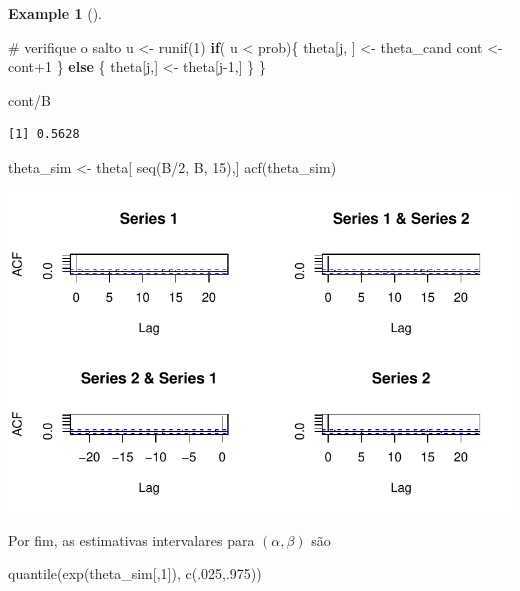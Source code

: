 \documentclass[
  letterpaper,
  DIV=11,
  numbers=noendperiod]{scrreprt}
\newenvironment{Shaded}{\begin{snugshade}}{\end{snugshade}}
\newcommand{\CommentTok}[1]{\textcolor[rgb]{0.37,0.37,0.37}{#1}}
\newcommand{\ControlFlowTok}[1]{\textcolor[rgb]{0.00,0.23,0.31}{\textbf{#1}}}
\newcommand{\DecValTok}[1]{\textcolor[rgb]{0.68,0.00,0.00}{#1}}
\newcommand{\FunctionTok}[1]{\textcolor[rgb]{0.28,0.35,0.67}{#1}}
\newcommand{\NormalTok}[1]{\textcolor[rgb]{0.00,0.23,0.31}{#1}}
\newcommand{\OtherTok}[1]{\textcolor[rgb]{0.00,0.23,0.31}{#1}}
\newcommand{\SpecialCharTok}[1]{\textcolor[rgb]{0.37,0.37,0.37}{#1}}
\theoremstyle{definition}
\theoremstyle{plain}
\theoremstyle{definition}
\newtheorem{example}{Example}[chapter]
\theoremstyle{remark}
\begin{document}
\begin{example}[]
\begin{Shaded}
\begin{Highlighting}[]
  \CommentTok{\# verifique o salto}
\NormalTok{  u }\OtherTok{\textless{}{-}} \FunctionTok{runif}\NormalTok{(}\DecValTok{1}\NormalTok{)}
  \ControlFlowTok{if}\NormalTok{( u }\SpecialCharTok{\textless{}}\NormalTok{ prob)\{}
\NormalTok{    theta[j, ] }\OtherTok{\textless{}{-}}\NormalTok{ theta\_cand}
\NormalTok{    cont }\OtherTok{\textless{}{-}}\NormalTok{ cont}\SpecialCharTok{+}\DecValTok{1}
\NormalTok{  \} }\ControlFlowTok{else}\NormalTok{ \{}
\NormalTok{    theta[j,] }\OtherTok{\textless{}{-}}\NormalTok{ theta[j}\DecValTok{{-}1}\NormalTok{,]}
\NormalTok{  \}}
\NormalTok{\}}

\NormalTok{cont}\SpecialCharTok{/}\NormalTok{B}
\end{Highlighting}
\end{Shaded}

\begin{verbatim}
[1] 0.5628
\end{verbatim}

\begin{Shaded}
\begin{Highlighting}[]
\NormalTok{theta\_sim }\OtherTok{\textless{}{-}}\NormalTok{ theta[ }\FunctionTok{seq}\NormalTok{(B}\SpecialCharTok{/}\DecValTok{2}\NormalTok{, B, }\DecValTok{15}\NormalTok{),]}
\FunctionTok{acf}\NormalTok{(theta\_sim)}
\end{Highlighting}
\end{Shaded}

\includegraphics{aproximacaoNormal_files/figure-pdf/unnamed-chunk-8-1.pdf}

Por fim, as estimativas intervalares para \((\alpha,\beta)\) são

\begin{Shaded}
\begin{Highlighting}[]
\FunctionTok{quantile}\NormalTok{(}\FunctionTok{exp}\NormalTok{(theta\_sim[,}\DecValTok{1}\NormalTok{]), }\FunctionTok{c}\NormalTok{(.}\DecValTok{025}\NormalTok{,.}\DecValTok{975}\NormalTok{))}
\end{Highlighting}
\end{Shaded}


\end{example}
\end{document}
